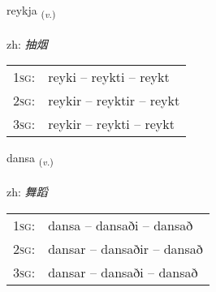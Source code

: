\documentclass[frontgrid, backgrid]{flacards}\usepackage[]{graphicx}\usepackage[]{color}
\begin{document}
\renewcommand{\flhead}{\vskip5pt \fboxsep=0pt {\small\bfseries\footnotesize Sagnorð | 动词}}
\renewcommand{\fcfoot}{\vskip5pt \fboxsep=0pt \hspace{2pt}{\small\bfseries\footnotesize 2K}}

\renewcommand{\blhead}{\vskip5pt {\small\bfseries\footnotesize Sagnorð | 动词 }}
\renewcommand{\bcfoot}{\vskip5pt \hspace{2pt}{\small\bfseries\footnotesize 2K}}


{reykja \small{\textsubscript{(\textit{v.})}} \\[1ex] %
\textphonetic{[reiːca]} \\
zh: \emph{抽烟} \\  [2ex]
\renewcommand*{\arraystretch}{0.8}
\begin{tabular}{p{1cm}l}
\textsc{1sg}: & reyki -- reykti -- reykt \\ 
\textsc{2sg}: & reykir -- reyktir -- reykt \\ 
\textsc{3sg}: & reykir -- reykti -- reykt \\ 
\end{tabular}
}

\renewcommand{\flhead}{\vskip5pt \fboxsep=0pt {\small\bfseries\footnotesize Sagnorð | 动词}}
\renewcommand{\fcfoot}{\vskip5pt \fboxsep=0pt \hspace{2pt}{\small\bfseries\footnotesize 2K}}

\renewcommand{\blhead}{\vskip5pt {\small\bfseries\footnotesize Sagnorð | 动词 }}
\renewcommand{\bcfoot}{\vskip5pt \hspace{2pt}{\small\bfseries\footnotesize 2K}}


{dansa \small{\textsubscript{(\textit{v.})}} \\[1ex] %
\textphonetic{[tansa]} \\
zh: \emph{舞蹈} \\  [2ex]
\renewcommand*{\arraystretch}{0.8}
\begin{tabular}{p{1cm}l}
\textsc{1sg}: & dansa -- dansaði -- dansað \\ 
\textsc{2sg}: & dansar -- dansaðir -- dansað \\ 
\textsc{3sg}: & dansar -- dansaði -- dansað \\ 
\end{tabular}
}
\end{document}
